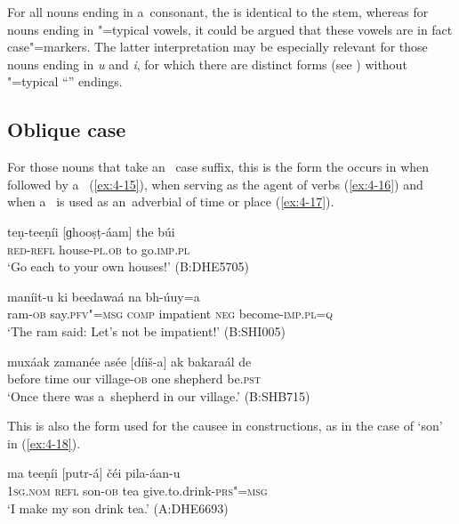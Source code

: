For all nouns ending in a~consonant, the  is identical to the  stem, whereas for nouns ending in "=typical vowels, it could be argued that these vowels are in fact  case"=markers. The latter interpretation may be especially relevant for those nouns ending in \textit{u} and \textit{i}, for which there are distinct  forms (see ) without "=typical ``'' endings.

\subsection{Oblique case}
\label{subsec:4-5-2}

For those nouns that take an~ case suffix, this is the form the  occurs in when followed by a~ (\ref{ex:4-15}), when serving as the agent of   verbs (\ref{ex:4-16}) and when a~ is used as an~adverbial of time or place (\ref{ex:4-17}). 


\begin{exe}
\ex
\label{ex:4-15}
\gll teṇ-teeṇíi [ɡhooṣṭ-áam] the búi\\
	\textsc{red}-\textsc{refl} house-\textsc{pl.ob} to go.\textsc{imp.pl} \\
\glt `Go each to your own houses!' (B:DHE5705)
\end{exe}

\begin{exe}
\ex
\label{ex:4-16}
\gll [míḍ-a] maníit-u ki beedawaá na bh-úuy=a \\
	ram-\textsc{ob} say.\textsc{pfv"=msg} \textsc{comp} impatient \textsc{neg} become-\textsc{imp.pl=q} \\
\glt `The ram said: Let's not be impatient!' (B:SHI005)
\end{exe}

\begin{exe}
\ex
\label{ex:4-17}
\gll muxáak zamanée asée [díiš-a] ak bakaraál de \\
	before time our village-\textsc{ob} one shepherd be.\textsc{pst} \\
\glt `Once there was a~shepherd in our village.' (B:SHB715)
\end{exe}

This is also the form used for the causee in  constructions, as in the case of `son' in (\ref{ex:4-18}). 


\begin{exe}
\ex
\label{ex:4-18}
\gll ma teeṇíi [putr-á] čéi pila-áan-u \\
	\textsc{1sg.nom} \textsc{refl} son-\textsc{ob} tea give.to.drink-\textsc{prs"=msg} \\
\glt `I make my son drink tea.' (A:DHE6693)
\end{exe}

